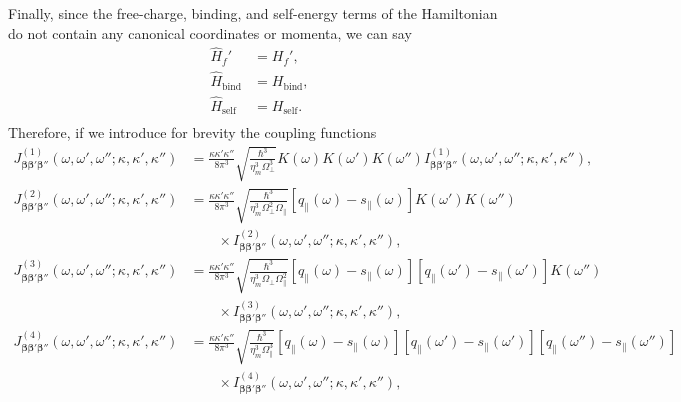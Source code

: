 \documentclass{article}
\begin{document}
Finally, since the free-charge, binding, and self-energy terms of the Hamiltonian do not contain any canonical coordinates or momenta, we can say
\begin{equation}
\begin{split}
\hat{H}_f' &= H_f',\\
\hat{H}_\mathrm{bind} &= H_\mathrm{bind},\\
\hat{H}_\mathrm{self} &= H_\mathrm{self}.\\
\end{split}
\end{equation}
Therefore, if we introduce for brevity the coupling functions
\begin{equation}
\begin{split}
J_{\bm{\beta}\bm{\beta}'\bm{\beta}''}^{(1)}(\omega,\omega',\omega'';\kappa,\kappa',\kappa'') &= \frac{\kappa\kappa'\kappa''}{8\pi^3}\sqrt{\frac{\hbar^3}{\eta_m^3\Omega_\perp^3}}K(\omega)K(\omega')K(\omega'')I_{\bm{\beta}\bm{\beta}'\bm{\beta}''}^{(1)}(\omega,\omega',\omega'';\kappa,\kappa',\kappa''),\\[0.5em]
J_{\bm{\beta}\bm{\beta}'\bm{\beta}''}^{(2)}(\omega,\omega',\omega'';\kappa,\kappa',\kappa'') &= \frac{\kappa\kappa'\kappa''}{8\pi^3}\sqrt{\frac{\hbar^3}{\eta_m^3\Omega_\perp^2\Omega_\parallel}}\left[q_\parallel(\omega) - s_\parallel(\omega)\right]K(\omega')K(\omega'')\\
&\qquad\times I_{\bm{\beta}\bm{\beta}'\bm{\beta}''}^{(2)}(\omega,\omega',\omega'';\kappa,\kappa',\kappa''),\\[0.5em]
J_{\bm{\beta}\bm{\beta}'\bm{\beta}''}^{(3)}(\omega,\omega',\omega'';\kappa,\kappa',\kappa'') &= \frac{\kappa\kappa'\kappa''}{8\pi^3}\sqrt{\frac{\hbar^3}{\eta_m^3\Omega_\perp\Omega_\parallel^2}}\left[q_\parallel(\omega) - s_\parallel(\omega)\right]\left[q_\parallel(\omega') - s_\parallel(\omega')\right]K(\omega'')\\
&\qquad\times I_{\bm{\beta}\bm{\beta}'\bm{\beta}''}^{(3)}(\omega,\omega',\omega'';\kappa,\kappa',\kappa''),\\[0.5em]
J_{\bm{\beta}\bm{\beta}'\bm{\beta}''}^{(4)}(\omega,\omega',\omega'';\kappa,\kappa',\kappa'') &= \frac{\kappa\kappa'\kappa''}{8\pi^3}\sqrt{\frac{\hbar^3}{\eta_m^3\Omega_\parallel^3}}\left[q_\parallel(\omega) - s_\parallel(\omega)\right]\left[q_\parallel(\omega') - s_\parallel(\omega')\right]\left[q_\parallel(\omega'') - s_\parallel(\omega'')\right]\\
&\qquad\times I_{\bm{\beta}\bm{\beta}'\bm{\beta}''}^{(4)}(\omega,\omega',\omega'';\kappa,\kappa',\kappa''),
\end{split}
\end{equation}
\end{document}
